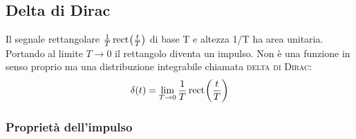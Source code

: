 \subsection{Delta di Dirac}
Il segnale rettangolare $\frac{1}{T} \,{\operatorname{rect}}^{}\!\left({\frac{t}{T}}\right)$ di base T e altezza 1/T ha area unitaria. Portando al limite $T\to 0$ il rettangolo diventa un impulso. Non è una funzione in senso proprio ma una distribuzione integrabile chiamata \textsc{delta di Dirac}:
\begin{equation}
\delta(t)=\lim\limits_{T\to 0}\frac{1}{T}\,{\operatorname{rect}}^{}\!\left({\frac{t}{T}}\right)
\end{equation}

\subsubsection{Proprietà dell'impulso}
